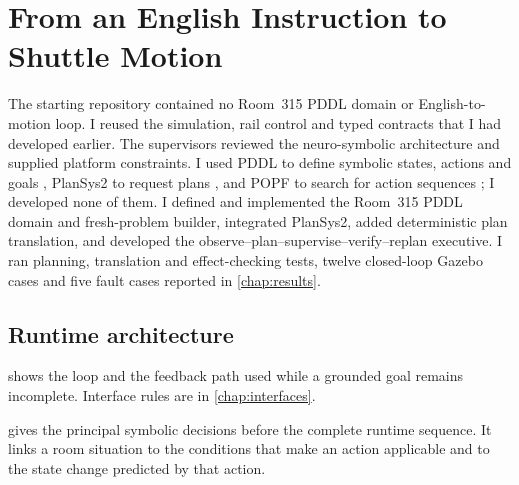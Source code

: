 \chapter{From an English Instruction to Shuttle Motion}
\label{chap:neurosymbolic}


\contributionboundary
  {The starting repository contained no Room~315 PDDL domain or
  English-to-motion loop. I reused the simulation, rail control and typed
  contracts that I had developed earlier.}
  {The supervisors reviewed the neuro-symbolic architecture and supplied
  platform constraints.}
  {I used PDDL to define symbolic states, actions and goals \citep{pddl},
  PlanSys2 to request plans \citep{plansys2}, and POPF to search for action
  sequences \citep{popf}; I developed none of them.}
  {I defined and implemented the Room~315 PDDL domain and fresh-problem builder,
  integrated PlanSys2, added deterministic plan translation, and developed the
  observe--plan--supervise--verify--replan executive.}
  {I ran planning, translation and effect-checking tests, twelve closed-loop
  Gazebo cases and five fault cases
  reported in \cref{chap:results}.}

\section{Runtime architecture}

 shows the loop and the feedback path used
while a grounded goal remains incomplete. Interface rules are in
\cref{chap:interfaces}.

 gives the principal symbolic decisions before the
complete runtime sequence. It links a room situation to the conditions that
make an action applicable and to the state change predicted by that action.

